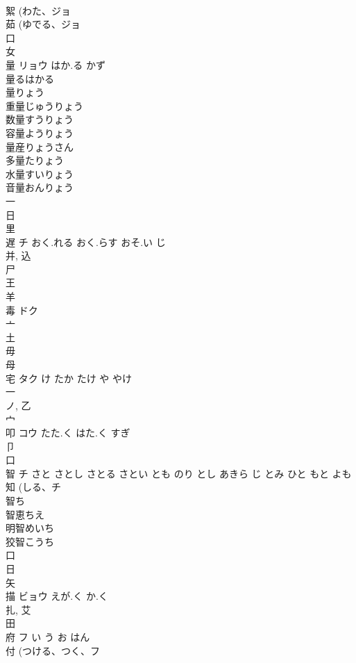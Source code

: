 \documentclass[8pt]{extreport}
\begin{document}
\begin{CJK}{UTF8}{min}
\\	絮 (わた、ジョ 
\\	茹 (ゆでる、ジョ 
\\	口 
\\	女 
\\	量	リョウ	はか.る かず	
\\	量るはかる
\\	量りょう
\\	重量じゅうりょう
\\	数量すうりょう
\\	容量ようりょう
\\	量産りょうさん
\\	多量たりょう
\\	水量すいりょう
\\	音量おんりょう
\\	一 
\\	日 
\\	里 
\\	遅	チ	おく.れる おく.らす おそ.い じ	
\\	并, 込 
\\	尸 
\\	王 
\\	羊 
\\	毒	ドク		
\\	亠 
\\	土 
\\	毋 
\\	母 
\\	宅	タク	け たか たけ や やけ	
\\	一 
\\	ノ, 乙 
\\	宀 
\\	叩	コウ	たた.く はた.く すぎ	
\\	卩 
\\	口 
\\	智	チ	さと さとし さとる さとい とも のり とし あきら じ とみ ひと もと よも	
\\	知 (しる、チ 
\\	智ち
\\	智恵ちえ
\\	明智めいち
\\	狡智こうち
\\	口 
\\	日 
\\	矢 
\\	描	ビョウ	えが.く か.く	
\\	扎, 艾 
\\	田 
\\	府	フ	い う お はん	
\\	付 (つける、つく、フ 

\end{CJK}
\end{document}
